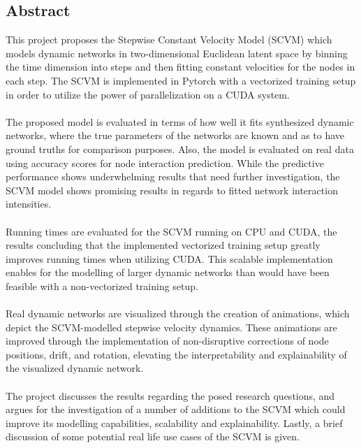 \subsection*{Abstract}

This project proposes the Stepwise Constant Velocity Model (SCVM) which models dynamic networks in two-dimensional Euclidean latent space by binning the time dimension into steps and then fitting constant velocities for the nodes in each step.
The SCVM is implemented in Pytorch with a vectorized training setup in order to utilize the power of parallelization on a CUDA system.
\\\\
The proposed model is evaluated in terms of how well it fits synthesized dynamic networks, where the true parameters of the networks are known and as to have ground truths for comparison purposes. 
Also, the model is evaluated on real data using accuracy scores for node interaction prediction. 
While the predictive performance shows underwhelming results that need further investigation, the SCVM model shows promising results in regards to fitted network interaction intensities.
\\\\
Running times are evaluated for the SCVM running on CPU and CUDA, the results concluding that the implemented vectorized training setup greatly improves running times when utilizing CUDA.
This scalable implementation enables for the modelling of larger dynamic networks than would have been feasible with a non-vectorized training setup.
\\\\
Real dynamic networks are visualized through the creation of animations, which depict the SCVM-modelled stepwise velocity dynamics.
These animations are improved through the implementation of non-disruptive corrections of node positions, drift, and rotation, elevating the interpretability and explainability of the visualized dynamic network.
\\\\
The project discusses the results regarding the posed research questions, and argues for the investigation of a number of additions to the SCVM which could improve its modelling capabilities, scalability and explainability.
Lastly, a brief discussion of some potential real life use cases of the SCVM is given.
